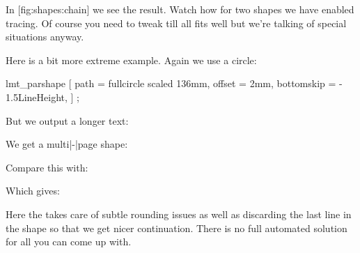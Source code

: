 \typebuffer[option=TEX]

In  [fig:shapes:chain] we see the result. Watch how for two shapes
we have enabled tracing. Of course you need to tweak till all fits well but we're
talking of special situations anyway.

\startplacefigure[Title=Multiple shapes,reference=fig:shapes:chain]
    \getbuffer
\stopplacefigure

Here is a bit more extreme example. Again we use a circle:

\startbuffer
{}
    lmt_parshape [
        path       = fullcircle scaled 136mm,
        offset     = 2mm,
        bottomskip = - 1.5LineHeight,
    ] ;
\stopuseMPgraphic
\stopbuffer

\typebuffer[option=TEX]

But we output a longer text:

\startbuffer
\startshapedparagraph[mp=circle,repeat=yes,method=cycle]%
    \dontcomplain
    {\darkred     {}}\par
    {\darkgreen   {}}\par
    {\darkblue    {}}\par
    {\darkcyan    {}}\par
    {\darkmagenta {}}\par
\stopshapedparagraph
\stopbuffer

\typebuffer[option=TEX]

We get a multi|-|page shape:

\start \getbuffer \stop

Compare this with:

\startbuffer
\startshapedparagraph[mp=circle,repeat=yes,method=cycle]%
    \dontcomplain
    {\darkred     {}}
    {\darkgreen   {}}
    {\darkblue    {}}
    {\darkcyan    {}}
    {\darkmagenta {}}
\stopshapedparagraph
\stopbuffer

\typebuffer[option=TEX]

Which gives:

\start \getbuffer \stop

Here the  takes care of subtle rounding issues as well as
discarding the last line in the shape so that we get nicer continuation. There is
no full automated solution for all you can come up with.

